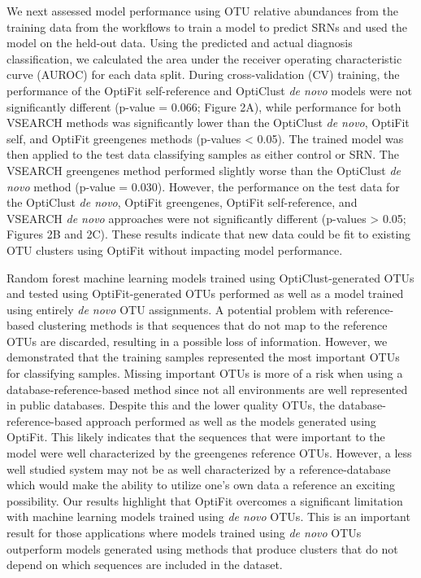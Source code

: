 \documentclass[
]{article}
\begin{document}
We next assessed model performance using OTU relative abundances from
the training data from the workflows to train a model to predict SRNs
and used the model on the held-out data. Using the predicted and actual
diagnosis classification, we calculated the area under the receiver
operating characteristic curve (AUROC) for each data split. During
cross-validation (CV) training, the performance of the OptiFit
self-reference and OptiClust \emph{de novo} models were not
significantly different (p-value = 0.066; Figure 2A), while performance
for both VSEARCH methods was significantly lower than the OptiClust
\emph{de novo}, OptiFit self, and OptiFit greengenes methods (p-values
\textless{} 0.05). The trained model was then applied to the test data
classifying samples as either control or SRN. The VSEARCH greengenes
method performed slightly worse than the OptiClust \emph{de novo} method
(p-value = 0.030). However, the performance on the test data for the
OptiClust \emph{de novo}, OptiFit greengenes, OptiFit self-reference,
and VSEARCH \emph{de novo} approaches were not significantly different
(p-values \textgreater{} 0.05; Figures 2B and 2C). These results
indicate that new data could be fit to existing OTU clusters using
OptiFit without impacting model performance.

Random forest machine learning models trained using OptiClust-generated
OTUs and tested using OptiFit-generated OTUs performed as well as a
model trained using entirely \emph{de novo} OTU assignments. A potential
problem with reference-based clustering methods is that sequences that
do not map to the reference OTUs are discarded, resulting in a possible
loss of information. However, we demonstrated that the training samples
represented the most important OTUs for classifying samples. Missing
important OTUs is more of a risk when using a database-reference-based
method since not all environments are well represented in public
databases. Despite this and the lower quality OTUs, the
database-reference-based approach performed as well as the models
generated using OptiFit. This likely indicates that the sequences that
were important to the model were well characterized by the greengenes
reference OTUs. However, a less well studied system may not be as well
characterized by a reference-database which would make the ability to
utilize one's own data a reference an exciting possibility. Our results
highlight that OptiFit overcomes a significant limitation with machine
learning models trained using \emph{de novo} OTUs. This is an important
result for those applications where models trained using \emph{de novo}
OTUs outperform models generated using methods that produce clusters
that do not depend on which sequences are included in the dataset.
\end{document}
